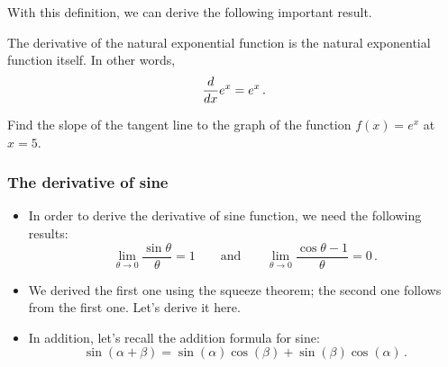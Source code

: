 \documentclass[10pt,t,presentation,ignorenonframetext,aspectratio=169]{beamer}
\begin{document}
\begin{frame}
  \vs
  With this definition, we can derive the following important result.
  \begin{thm}
    The derivative of the natural exponential function is the natural exponential function itself.  In other words,
    \[
      \frac{d}{\mathop{}\!d x} e^x = e^x \,.
    \]
  \end{thm}
\end{frame}

\begin{frame}
  \vs
  \begin{question}
    Find the slope of the tangent line to the graph of the function $f(x) = e^x$ at $x=5$.
  \end{question}
\end{frame}


\begin{frame}
  \frametitle{The derivative of sine}
  \begin{itemize}
  \item In order to derive the derivative of sine function, we need the following results:
    \[
      \lim_{\theta \to 0} \frac{\sin \theta}{\theta} = 1
      \qquad \text{and} \qquad
      \lim_{\theta \to 0} \frac{\cos \theta - 1}{\theta} = 0 \,.
    \]
  \item We derived the first one using the squeeze theorem; the second
    one follows from the first one. Let's derive it here.
  \item In addition, let's recall the addition formula for sine:
    \[
      \sin(\alpha+\beta)
      = \sin(\alpha)\cos(\beta)+\sin(\beta)\cos(\alpha) \,.
    \]
  \end{itemize}
\end{frame}
\end{document}
